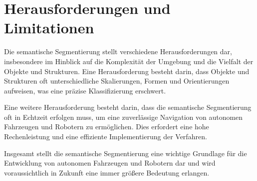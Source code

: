 \section{Herausforderungen und Limitationen}
Die semantische Segmentierung stellt verschiedene Herausforderungen dar,
insbesondere im Hinblick auf die Komplexität der Umgebung und die Vielfalt der
Objekte und Strukturen. Eine Herausforderung besteht darin, dass Objekte und
Strukturen oft unterschiedliche Skalierungen, Formen und Orientierungen
aufweisen, was eine präzise Klassifizierung erschwert.

Eine weitere Herausforderung besteht darin, dass die semantische Segmentierung
oft in Echtzeit erfolgen muss, um eine zuverlässige Navigation von autonomen
Fahrzeugen und Robotern zu ermöglichen. Dies erfordert eine hohe Rechenleistung
und eine effiziente Implementierung der Verfahren.

Insgesamt stellt die semantische Segmentierung eine wichtige Grundlage für die
Entwicklung von autonomen Fahrzeugen und Robotern dar und wird voraussichtlich
in Zukunft eine immer größere Bedeutung erlangen.